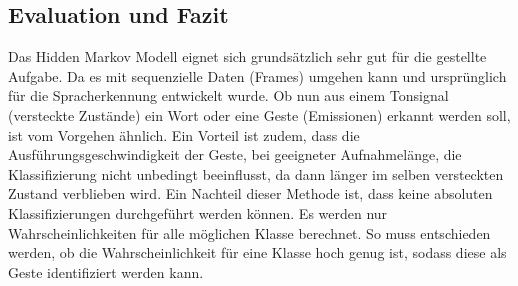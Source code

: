 \subsection{Evaluation und Fazit}  \label{sec:result}
Das Hidden Markov Modell eignet sich grundsätzlich sehr gut für die gestellte Aufgabe. Da es mit sequenzielle Daten (Frames) umgehen 
kann und ursprünglich für die Spracherkennung entwickelt wurde. Ob nun aus einem Tonsignal (versteckte Zustände) ein Wort oder 
eine Geste (Emissionen) erkannt werden soll, ist vom Vorgehen ähnlich. Ein Vorteil ist zudem, dass die Ausführungsgeschwindigkeit
 der Geste, bei geeigneter Aufnahmelänge, die Klassifizierung nicht unbedingt beeinflusst, da dann länger im selben versteckten 
 Zustand verblieben wird.
Ein Nachteil dieser Methode ist, dass keine absoluten Klassifizierungen durchgeführt werden können. Es werden nur Wahrscheinlichkeiten für alle möglichen Klasse berechnet. 
So muss entschieden werden, ob die Wahrscheinlichkeit für eine Klasse hoch genug ist, sodass diese als Geste identifiziert werden kann.


